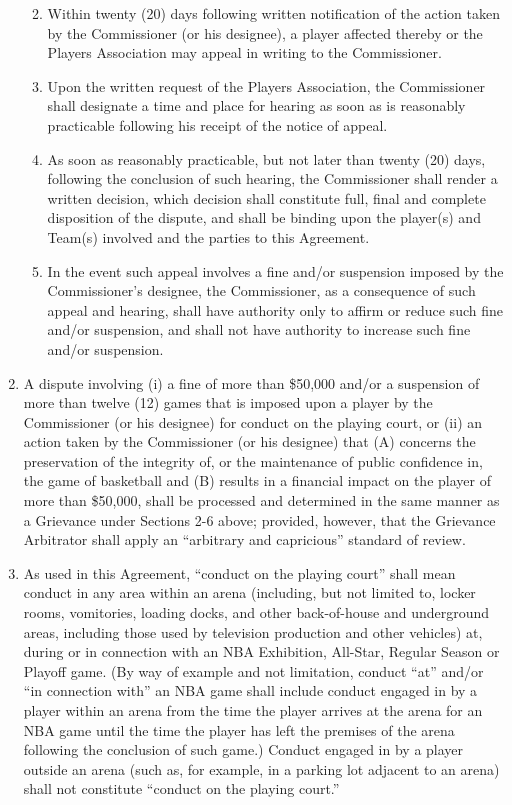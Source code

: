 \documentclass[
]{book}
\providecommand{\tightlist}{%
  \setlength{\itemsep}{0pt}\setlength{\parskip}{0pt}}
\begin{document}
\begin{enumerate}
  \begin{enumerate}
  \def\labelenumii{(\arabic{enumii})}
  \tightlist
  \item
    Within twenty (20) days following written notification of the action taken by the Commissioner (or his designee), a player affected thereby or the Players Association may appeal in writing to the Commissioner.
  \item
    Upon the written request of the Players Association, the Commissioner shall designate a time and place for hearing as soon as is reasonably practicable following his receipt of the notice of appeal.
  \item
    As soon as reasonably practicable, but not later than twenty (20) days, following the conclusion of such hearing, the Commissioner shall render a written decision, which decision shall constitute full, final and complete disposition of the dispute, and shall be binding upon the player(s) and Team(s) involved and the parties to this Agreement.
  \item
    In the event such appeal involves a fine and/or suspension imposed by the Commissioner's designee, the Commissioner, as a consequence of such appeal and hearing, shall have authority only to affirm or reduce such fine and/or suspension, and shall not have authority to increase such fine and/or suspension.
  \end{enumerate}
\item
  A dispute involving (i) a fine of more than \$50,000 and/or a suspension of more than twelve (12) games that is imposed upon a player by the Commissioner (or his designee) for conduct on the playing court, or (ii) an action taken by the Commissioner (or his designee) that (A) concerns the preservation of the integrity of, or the maintenance of public confidence in, the game of basketball and (B) results in a financial impact on the player of more than \$50,000, shall be processed and determined in the same manner as a Grievance under Sections 2-6 above; provided, however, that the Grievance Arbitrator shall apply an ``arbitrary and capricious'' standard of review.
\item
  As used in this Agreement, ``conduct on the playing court'' shall mean conduct in any area within an arena (including, but not limited to, locker rooms, vomitories, loading docks, and other back-of-house and underground areas, including those used by television production and other vehicles) at, during or in connection with an NBA Exhibition, All-Star, Regular Season or Playoff game. (By way of example and not limitation, conduct ``at'' and/or ``in connection with'' an NBA game shall include conduct engaged in by a player within an arena from the time the player arrives at the arena for an NBA game until the time the player has left the premises of the arena following the conclusion of such game.) Conduct engaged in by a player outside an arena (such as, for example, in a parking lot adjacent to an arena) shall not constitute ``conduct on the playing court.''

\end{enumerate}
\end{document}
